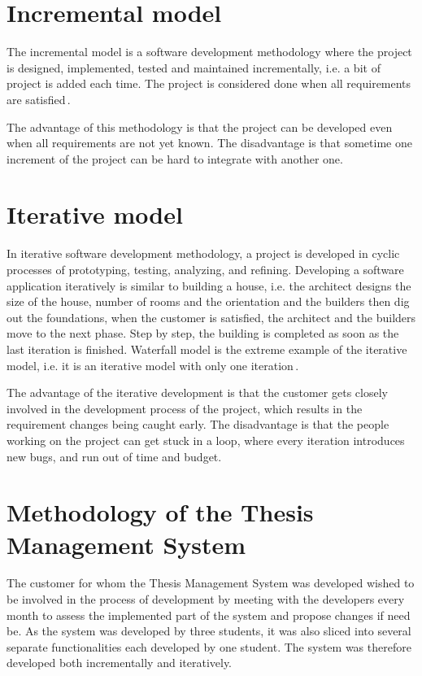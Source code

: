 \section{Incremental model}

The incremental model is a software development methodology where the project is designed, implemented, tested and maintained incrementally, i.e. a bit of project is added each time. The project is considered done when all requirements are satisfied\,\cite{agile-iterative-development}.

The advantage of this methodology is that the project can be developed even when all requirements are not yet known. The disadvantage is that sometime one increment of the project can be hard to integrate with another one.

\section{Iterative model}

In iterative software development methodology, a project is developed in cyclic processes of prototyping, testing, analyzing, and refining. Developing a software application iteratively is similar to building a house, i.e. the architect designs the size of the house, number of rooms and the orientation and the builders then dig out the foundations, when the customer is satisfied, the architect and the builders move to the next phase. Step by step, the building is completed as soon as the last iteration is finished. Waterfall model is the extreme example of the iterative model, i.e. it is an iterative model with only one iteration\,\cite{agile-iterative-development}.

The advantage of the iterative development is that the customer gets closely involved in the development process of the project, which results in the requirement changes being caught early. The disadvantage is that the people working on the project can get stuck in a loop, where every iteration introduces new bugs, and run out of time and budget.

\section{Methodology of the Thesis Management System}

The customer for whom the Thesis Management System was developed wished to be involved in the process of development by meeting with the developers every month to assess the implemented part of the system and propose changes if need be. As the system was developed by three students, it was also sliced into several separate functionalities each developed by one student. The system was therefore developed both incrementally and iteratively.